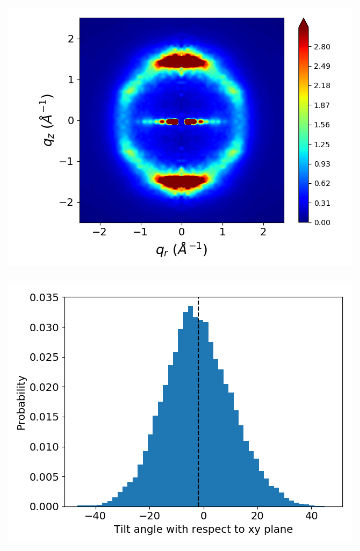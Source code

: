 \documentclass[journal=jpcbfk,manuscript=article]{achemso}
\begin{document}
  \begin{figure}[!htb]
  \begin{subfigure}{0.32\linewidth}
  	\centering
  	\includegraphics[width=\textwidth]{rzplot_layered_280K_jet.png}
  	\caption{}\label{fig:sandwiched280K}
  \end{subfigure}
  \begin{subfigure}{0.32\linewidth}
    \includegraphics[width=\textwidth]{tilt_dist.png}
    \caption{}\label{fig:tilt}
  \end{subfigure}
  \begin{subfigure}{0.32\linewidth}
	\centering

\end{subfigure}
\end{figure}
\end{document}
